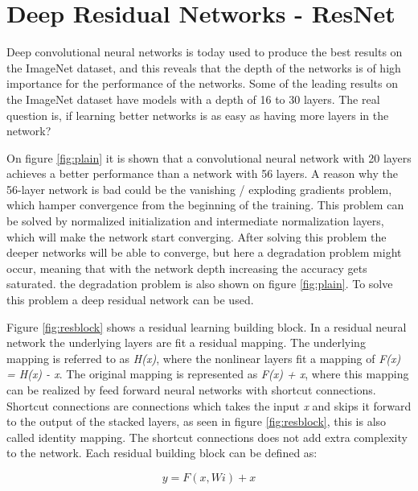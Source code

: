 \section{Deep Residual Networks - ResNet}

Deep convolutional neural networks is today used to produce the best results on the ImageNet dataset, and this reveals that the depth of the networks is of high importance for the performance of the networks\citep{RESNET}. Some of the leading results on the ImageNet dataset have models with a depth of 16 to 30 layers. The real question is, if learning better networks is as easy as having more layers in the network?


On figure \ref{fig:plain} it is shown that a convolutional neural network with 20 layers achieves a better performance than a network with 56 layers. A reason why the 56-layer network is bad could be the vanishing / exploding gradients problem, which hamper convergence from the beginning of the training. This problem can be solved by normalized initialization and intermediate normalization layers, which will make the network start converging. After solving this problem the deeper networks will be able to converge, but here a degradation problem might occur, meaning that with the network depth increasing the accuracy gets saturated. the degradation problem is also shown on figure \ref{fig:plain}. To solve this problem a deep residual network can be used.


Figure \ref{fig:resblock} shows a residual learning building block. In a residual neural network the underlying layers are fit a residual mapping. The underlying mapping is referred to as \emph{H(x)}, where the nonlinear layers fit a mapping of \emph{F(x) = H(x) - x}. The original mapping is represented as \emph{F(x) + x}, where this mapping can be realized by feed forward neural networks with shortcut connections. Shortcut connections are connections which takes the input \emph{x} and skips it forward to the output of the stacked layers, as seen in figure \ref{fig:resblock}, this is also called identity mapping. The shortcut connections does not add extra complexity to the network. Each residual building block can be defined as:

\begin{equation} \label{eq:res}
y = F(x, {Wi}) + x
\end{equation} 

